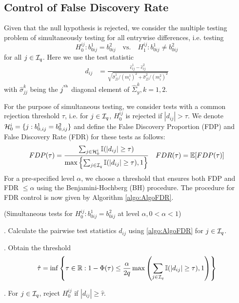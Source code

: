 \subsection{Control of False Discovery Rate}
Given that the null hypothesis is rejected, we consider the multiple testing problem of simultaneously testing for all entrywise differences, i.e. testing
%
$$
H_0^{ij}: b_{0 ij}^1 = b_{0ij}^2 \quad \text{vs.} \quad H_1^{ij}: b_{0 ij}^1 \neq b_{0 ij}^2 
$$
%
for all $j \in {\cal{I}}_q$. Here we use the test statistic
%
\begin{align}\label{eqn:PairwiseStatistic}
d_{ij} &= \frac{\widehat c_{ij}^1 - \widehat c_{ij}^2}{\sqrt{\hat \sigma_{jj}^1/ (m_i^1)^2 + \hat \sigma_{jj}^2/ (m_i^2)^2}}
\end{align}
%
with $\hat \sigma_{jj}^k$ being the $j^{\operatorname*{^{\text{th}}}}$ diagonal element of $\widehat \Sigma_y^k, k = 1,2$.

For the purpose of simultaneous testing, we consider tests with a common rejection threshold $\tau$, i.e. for $j \in {\cal{I}}_q$, $H_0^{ij}$ is rejected if $| d_{ij} | > \tau$. We denote ${\cal{H}}_0^i = \{ j: b_{0,ij}^1 = b_{0,ij}^2 \}$ and define the False Discovery Proportion (FDP) and False Discovery Rate (FDR) for these tests as follows:
%
$$
FDP (\tau) = \frac{\sum_{j \in {\cal{H}}_0^i} {\mathbb{I}}( |d_{ij}| \geq \tau)}{\max\left\{
\sum_{j \in {\cal{I}}_q} {\mathbb{I}}( |d_{ij}| \geq \tau), 1\right\} }\quad
FDR (\tau) = {\mathbb{E}} [ FDP (\tau) ]
$$
%
For a pre-specified level $\alpha$, we choose a threshold that ensures both FDP and FDR $\leq \alpha$ using the Benjamini-Hochberg (BH) procedure. %
The procedure for FDR control is now given by Algorithm \ref{algo:AlgoFDR}.

\begin{Algorithm}\label{algo:AlgoFDR}
(Simultaneous tests for $H_0^{ij}: b_{0 ij}^1 = b_{0 ij}^2$ at level $\alpha, 0< \alpha< 1$)

. Calculate the pairwise test statistics $d_{ij}$ using \eqref{algo:AlgoFDR} for $j \in {\cal{I}}_q$.

. Obtain the threshold
%
$$
\hat \tau = \inf \left\{\tau \in {\mathbb{R}}: 1 - \Phi(\tau) \leq \frac{\alpha}{2 q}
\max \left( \sum_{j \in {\cal{I}}_q} {\mathbb{I}}( |d_{ij}| \geq \tau), 1 \right) \right\}
$$
%

. For $j \in {\cal{I}}_q$, reject $H_0^{ij}$ if $|d_{ij}| \geq \hat \tau$.
\end{Algorithm}

